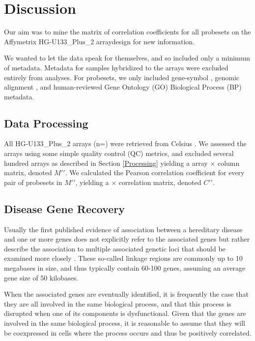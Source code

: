 \documentclass{bioinfo}
\begin{document}
\section{Discussion}\label{Discussion}

Our aim was to mine the matrix of correlation coefficients for all probesets on
the Affymetrix HG-U133\_Plus\_2 arraydesign for new information.

We wanted to let the data speak for themselves, and so included only a minimum
of metadata.  Metadata for samples hybridized to the arrays were excluded
entirely from analyses.  For probesets, we only included gene-symbol
\cite{netaffx}, genomic alignment \cite{karolchik}, and human-reviewed Gene
Ontology (GO) Biological Process (BP) \cite{go, bioconductor} metadata.

\subsection{Data Processing}\label{Processing Results}

All HG-U133\_Plus\_2 arrays (n=) were retrieved from Celsius
\cite{celsius}.  We assessed the arrays using some simple quality control (QC)
metrics, and excluded several hundred arrays as described in Section
\ref{Processing} yielding a  array $\times$  column
matrix, denoted $M\prime\prime$.  We calculated the Pearson correlation
coefficient for every pair of probesets in $M\prime\prime$, yielding a
 $\times$  correlation matrix, denoted
$C\prime\prime$.

\subsection{Disease Gene Recovery}\label{Recovery}

Usually the first published evidence of association between a hereditary
disease and one or more genes does not explicitly refer to the associated genes
but rather describe the association to multiple associated genetic loci that
should be examined more closely \cite{joubert,microcephaly}.  These so-called
linkage regions are commonly up to 10 megabases in size, and thus typically
contain 60-100 genes, assuming an average gene size of 50 kilobases.

When the associated genes are eventually identified, it is frequently the case
that they are all involved in the same biological process, and that this
process is disrupted when one of its components is dysfunctional.  Given that
the genes are involved in the same biological process, it is reasonable to
assume that they will be coexpressed in cells where the process occurs and
thus be positively correlated.
\end{document}
